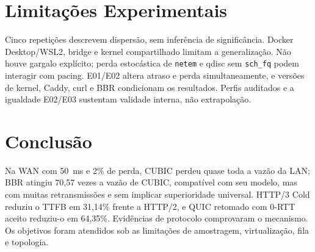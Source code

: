 \documentclass[12pt]{article}
\begin{document}
\FloatBarrier
\section{Limitações Experimentais}

Cinco repetições descrevem dispersão, sem inferência de significância. Docker Desktop/WSL2, bridge e kernel compartilhado limitam a generalização. Não houve gargalo explícito; perda estocástica de \texttt{netem} e qdisc sem \texttt{sch\_fq} podem interagir com pacing. E01/E02 altera atraso e perda simultaneamente, e versões de kernel, Caddy, curl e BBR condicionam os resultados. Perfis auditados e a igualdade E02/E03 sustentam validade interna, não extrapolação.

\section{Conclusão}

Na WAN com 50~ms e 2\% de perda, CUBIC perdeu quase toda a vazão da LAN; BBR atingiu 70,57 vezes a vazão de CUBIC, compatível com seu modelo, mas com muitas retransmissões e sem implicar superioridade universal. HTTP/3 Cold reduziu o TTFB em 31,14\% frente a HTTP/2, e QUIC retomado com 0-RTT aceito reduziu-o em 64,35\%. Evidências de protocolo comprovaram o mecanismo. Os objetivos foram atendidos sob as limitações de amostragem, virtualização, fila e topologia.



\end{document}
